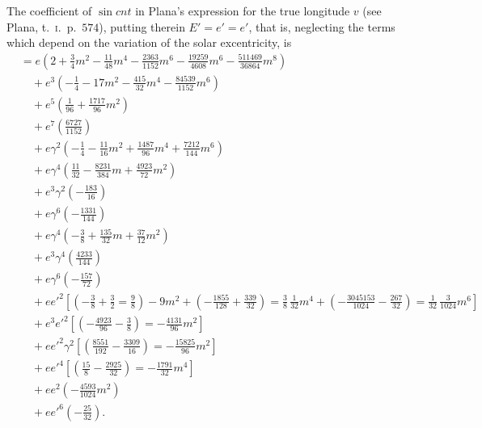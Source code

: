 \documentclass[11pt]{article}
\begin{document}
The coefficient of $\sin cnt$ in Plana's expression for the true
longitude $v$ (see Plana, t.\ \textsc{i}.\ p.\ $574$), putting therein
$E' = e' = e'$, that is, neglecting the terms which depend on the
variation of the solar excentricity, is
\begin{align*}
&\!= e\left(2 + \tfrac{3}{4}m^{2} - \tfrac{11}{48}m^{4} - \tfrac{2363}{1152}m^{6} - \tfrac{19259}{4608}m^{6}
     - \tfrac{511469}{36864}m^{8}\right) \\
&\quad + e^{3}\left(-\tfrac{1}{4} - 17m^{2} - \tfrac{415}{32}m^{4} - \tfrac{84539}{1152}m^{6}\right) \\
&\quad + e^{5}\left(\tfrac{1}{96} + \tfrac{1717}{96}m^{2}\right) \\
&\quad + e^{7}\left(\tfrac{6727}{1152}\right) \\
&\quad + e\gamma^{2}\left(-\tfrac{1}{4} - \tfrac{11}{16}m^{2} + \tfrac{1487}{96}m^{4} + \tfrac{7212}{144}m^{6}\right) \\
&\quad + e\gamma^{4}\left(\tfrac{11}{32} - \tfrac{8231}{384}m + \tfrac{4923}{72}m^{2}\right) \\
&\quad + e^{3}\gamma^{2}\left(-\tfrac{183}{16}\right) \\
&\quad + e\gamma^{6}\left(-\tfrac{1331}{144}\right) \\
&\quad + e\gamma^{4}\left(-\tfrac{3}{8} + \tfrac{135}{32}m + \tfrac{37}{12}m^{2}\right) \\
&\quad + e^{3}\gamma^{4}\left(\tfrac{4233}{144}\right) \\
&\quad + e\gamma^{6}\left(-\tfrac{157}{72}\right) \\
&\quad + ee'^{2}\!\left[\left(-\tfrac{3}{8} + \tfrac{3}{2} = \tfrac{9}{8}\right) - 9m^{2}
   + \left(-\tfrac{1855}{128} + \tfrac{339}{32}\right)\!=\!\tfrac{3}{8}\,\tfrac{1}{32}m^{4}
   + \left(-\tfrac{3045153}{1024} - \tfrac{267}{32}\right)\!=\!\tfrac{1}{32}\,\tfrac{3}{1024}m^{6}\right] \\
&\quad + e^{3}e'^{2}\!\left[\left(-\tfrac{4923}{96} - \tfrac{3}{8}\right) = -\tfrac{4131}{96}m^{2}\right] \\
&\quad + ee'^{2}\gamma^{2}\!\left[\left(\tfrac{8551}{192} - \tfrac{3309}{16}\right) = -\tfrac{15825}{96}m^{2}\right] \\
&\quad + ee'^{4}\!\left[\left(\tfrac{15}{8} - \tfrac{2925}{32}\right) = -\tfrac{1791}{32}m^{4}\right] \\
&\quad + ee^{2}\left(-\tfrac{4593}{1024}m^{2}\right) \\
&\quad + ee'^{6}\!\left(-\tfrac{25}{32}\right).
\end{align*}
\end{document}
